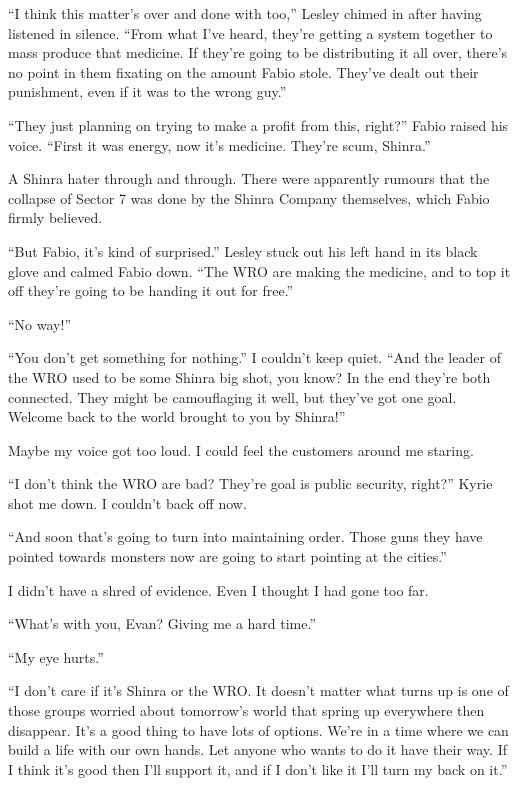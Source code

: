\documentclass[oneside]{book}
\begin{document}
“I think this matter’s over and done with too,” Lesley chimed in after having listened in silence. “From what I’ve heard, they’re getting a system together to mass produce that medicine. If they’re going to be distributing it all over, there’s no point in them fixating on the amount Fabio stole. They’ve dealt out their punishment, even if it was to the wrong guy.”

“They just planning on trying to make a profit from this, right?” Fabio raised his voice. “First it was energy, now it’s medicine. They’re scum, Shinra.”

A Shinra hater through and through. There were apparently rumours that the collapse of Sector 7 was done by the Shinra Company themselves, which Fabio firmly believed.

“But Fabio, it’s kind of surprised.” Lesley stuck out his left hand in its black glove and calmed Fabio down. “The WRO are making the medicine, and to top it off they’re going to be handing it out for free.”

“No way!”

“You don’t get something for nothing.” I couldn’t keep quiet. “And the leader of the WRO used to be some Shinra big shot, you know? In the end they’re both connected. They might be camouflaging it well, but they’ve got one goal. Welcome back to the world brought to you by Shinra!”

Maybe my voice got too loud. I could feel the customers around me staring.

“I don’t think the WRO are bad? They’re goal is public security, right?” Kyrie shot me down. I couldn’t back off now.

“And soon that’s going to turn into maintaining order. Those guns they have pointed towards monsters now are going to start pointing at the cities.”

I didn’t have a shred of evidence. Even I thought I had gone too far.

“What’s with you, Evan? Giving me a hard time.”

“My eye hurts.”

“I don’t care if it’s Shinra or the WRO. It doesn’t matter what turns up is one of those groups worried about tomorrow’s world that spring up everywhere then disappear. It’s a good thing to have lots of options. We’re in a time where we can build a life with our own hands. Let anyone who wants to do it have their way. If I think it’s good then I’ll support it, and if I don’t like it I’ll turn my back on it.”
\end{document}
